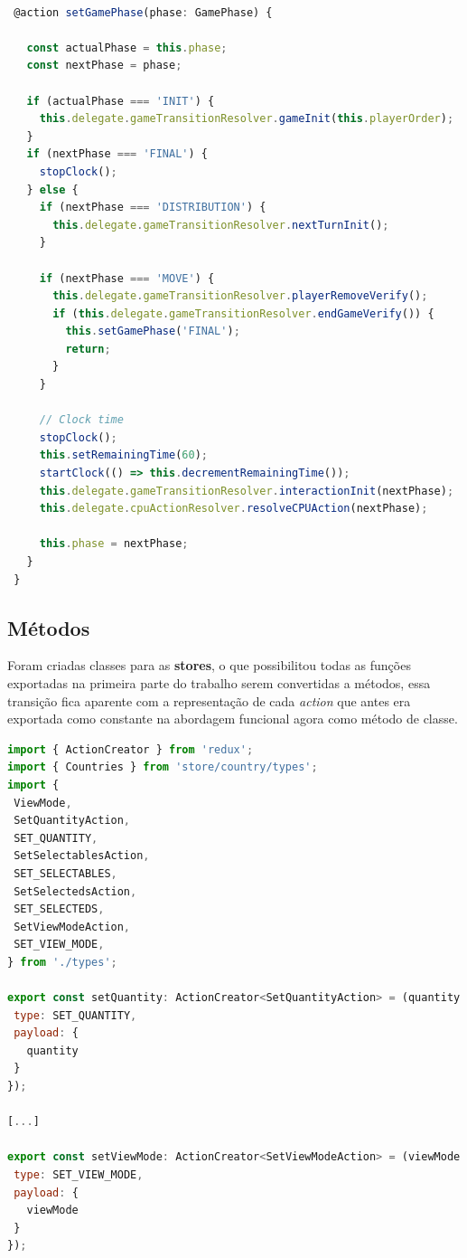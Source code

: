 \documentclass[rel_mlp]{iiufrgs}
\begin{document}
\begin{lstlisting}[language=JavaScript]

 @action setGamePhase(phase: GamePhase) {

   const actualPhase = this.phase;
   const nextPhase = phase;

   if (actualPhase === 'INIT') {
     this.delegate.gameTransitionResolver.gameInit(this.playerOrder);
   }
   if (nextPhase === 'FINAL') {
     stopClock();
   } else {
     if (nextPhase === 'DISTRIBUTION') {
       this.delegate.gameTransitionResolver.nextTurnInit();
     }

     if (nextPhase === 'MOVE') {
       this.delegate.gameTransitionResolver.playerRemoveVerify();
       if (this.delegate.gameTransitionResolver.endGameVerify()) {
         this.setGamePhase('FINAL');
         return;
       }
     }

     // Clock time
     stopClock();
     this.setRemainingTime(60);
     startClock(() => this.decrementRemainingTime());
     this.delegate.gameTransitionResolver.interactionInit(nextPhase);
     this.delegate.cpuActionResolver.resolveCPUAction(nextPhase);

     this.phase = nextPhase;
   }
 }

\end{lstlisting}

\subsection{Métodos}

Foram criadas classes para as \textbf{stores}, o que possibilitou todas as funções exportadas na primeira parte do trabalho serem convertidas a métodos,
essa transição fica aparente com a representação de cada \textit{action} que antes era exportada como constante na abordagem funcional agora como método de classe.

\begin{lstlisting}[language=JavaScript]
import { ActionCreator } from 'redux';
import { Countries } from 'store/country/types';
import {
 ViewMode,
 SetQuantityAction,
 SET_QUANTITY,
 SetSelectablesAction,
 SET_SELECTABLES,
 SetSelectedsAction,
 SET_SELECTEDS,
 SetViewModeAction,
 SET_VIEW_MODE,
} from './types';

export const setQuantity: ActionCreator<SetQuantityAction> = (quantity: number) => ({
 type: SET_QUANTITY,
 payload: {
   quantity
 }
});

[...]

export const setViewMode: ActionCreator<SetViewModeAction> = (viewMode: ViewMode) => ({
 type: SET_VIEW_MODE,
 payload: {
   viewMode
 }
});
\end{lstlisting}
\end{document}
